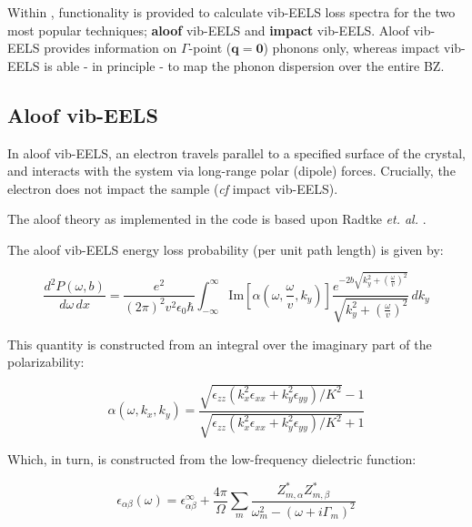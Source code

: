 \documentclass[a4paper,11pt,twoside]{book}
\begin{document}
{Within \optados, functionality is provided to calculate vib-EELS loss spectra for the two most popular techniques; \textbf{aloof} vib-EELS and \textbf{impact} vib-EELS. Aloof vib-EELS provides information on $\Gamma$-point ($\mathbf{q}=\mathbf{0}$) phonons only, whereas impact vib-EELS is able - in principle - to map the phonon dispersion over the entire BZ.

\subsection{Aloof vib-EELS}

In aloof vib-EELS, an electron travels parallel to a specified surface of the crystal, and interacts with the system via long-range polar (dipole) forces. Crucially, the electron does not impact the sample (\textit{cf} impact vib-EELS).

The aloof theory as implemented in the \optados code is based upon Radtke \textit{et. al.} \cite{Radtke_et_al_2017}.

The aloof vib-EELS energy loss probability (per unit path length) is given by:

\begin{equation}
\frac{d^2P(\omega,b)}{d\omega\,dx}
=
\frac{e^2}{(2\pi)^2 v^2\epsilon_0\hbar}
\int_{-\infty}^{\infty}
\mathrm{Im}
\left[
\alpha\left(\omega,\frac{\omega}{v},k_y\right)
\right]
\frac{
e^{-2b\sqrt{k_y^2+\left(\frac{\omega}{v}\right)^2}}
}{
\sqrt{k_y^2+\left(\frac{\omega}{v}\right)^2}
}
\,dk_y
\label{Eqn:aloof_loss}
\end{equation}

This quantity is constructed from an integral over the imaginary part of the polarizability:

\begin{equation}
\alpha(\omega,k_x,k_y) =
\frac{
\sqrt{\epsilon_{zz}
\left(k_x^2\epsilon_{xx}+k_y^2\epsilon_{yy}\right)/K^2
}-1}{
\sqrt{
\epsilon_{zz}
\left(k_x^2\epsilon_{xx}+k_y^2\epsilon_{yy}\right)/K^2} + 1}
\label{Eqn:aloof_alpha}
\end{equation}

Which, in turn, is constructed from the low-frequency dielectric function:

\begin{equation}
\epsilon_{\alpha\beta}(\omega)
=
\epsilon^{\infty}_{\alpha\beta}
+
\frac{4\pi}{\Omega}
\sum_m
\frac{Z^{*}_{m,\alpha} Z^{*}_{m,\beta}}
{\omega_m^2 - (\omega + i\Gamma_m)^2}
\label{Eqn:aloof_eps_lf}
\end{equation}

}
\end{document}
